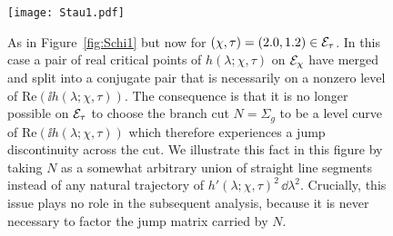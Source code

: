\begin{figure}[h]
\begin{center}
\texttt{[image: Stau1.pdf]}
\end{center}
\caption{As in Figure~\ref{fig:Schi1} but now for $(\chi,\tau)=(2.0,1.2)\in \mathcal{E}_\tau$.  In this case a pair of real critical points of $h(\lambda;\chi,\tau)$ on $\mathcal{E}_\chi$ have merged and split into a conjugate pair that is necessarily on a nonzero level of $\mathrm{Re}(\ii h(\lambda;\chi,\tau))$.  The consequence is that it is no longer possible on $\mathcal{E}_\tau$ to choose the branch cut $N=\Sigma_g$ to be a level curve of $\mathrm{Re}(\ii h(\lambda;\chi,\tau))$ which therefore experiences a jump discontinuity across the cut.  We illustrate this fact in this figure by taking $N$ as a somewhat arbitrary union of straight line segments instead of any natural trajectory of $h'(\lambda;\chi,\tau)^2\,\dd\lambda^2$.  Crucially, this issue plays no role in the subsequent analysis, because it is never necessary to factor the jump matrix carried by $N$.}
\label{fig:Stau1}
\end{figure}

